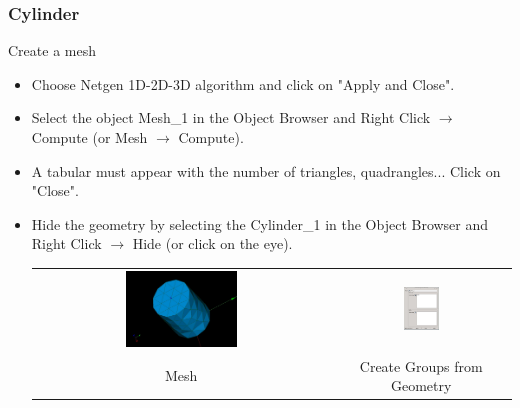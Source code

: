 \documentclass[10pt]{beamer}
\begin{document}
\begin{frame}
\frametitle{Cylinder}
\begin{block}{Create a mesh}

\begin{itemize}
\item Choose Netgen 1D-2D-3D algorithm and click on "Apply and Close".
\item Select the object Mesh\_1 in the Object Browser and Right Click $\rightarrow$ Compute (or Mesh $\rightarrow$ Compute).
\item A tabular must appear with the number of triangles, quadrangles... Click on "Close".
\item Hide the geometry by selecting the Cylinder\_1 in the Object Browser and Right Click $\rightarrow$ Hide (or click on the eye).
\begin{tabular}{cc}
\includegraphics[width=0.39\textwidth]{PICTURES/salome4} & \includegraphics[width=0.21\textwidth]{PICTURES/salome5}\tabularnewline
Mesh & Create Groups from Geometry \tabularnewline
\end{tabular}

\end{itemize}

\end{block}
\end{frame}
\end{document}
